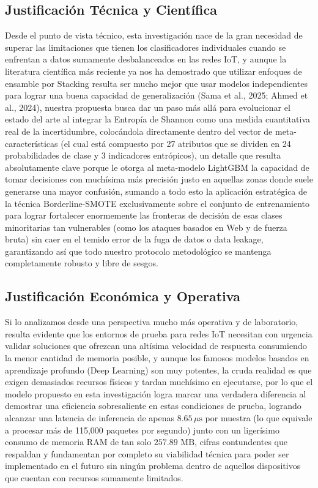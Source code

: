 \subsection{Justificación Técnica y Científica}
Desde el punto de vista técnico, esta investigación nace de la gran necesidad de superar las limitaciones que tienen los clasificadores individuales cuando se enfrentan a datos sumamente desbalanceados en las redes IoT, y aunque la literatura científica más reciente ya nos ha demostrado que utilizar enfoques de ensamble por Stacking resulta ser mucho mejor que usar modelos independientes para lograr una buena capacidad de generalización (Sama et al., 2025; Ahmed et al., 2024), nuestra propuesta busca dar un paso más allá para evolucionar el estado del arte al integrar la Entropía de Shannon como una medida cuantitativa real de la incertidumbre, colocándola directamente dentro del vector de meta-características (el cual está compuesto por 27 atributos que se dividen en 24 probabilidades de clase y 3 indicadores entrópicos), un detalle que resulta absolutamente clave porque le otorga al meta-modelo LightGBM la capacidad de tomar decisiones con muchísima más precisión justo en aquellas zonas donde suele generarse una mayor confusión, sumando a todo esto la aplicación estratégica de la técnica Borderline-SMOTE exclusivamente sobre el conjunto de entrenamiento para lograr fortalecer enormemente las fronteras de decisión de esas clases minoritarias tan vulnerables (como los ataques basados en Web y de fuerza bruta) sin caer en el temido error de la fuga de datos o data leakage, garantizando así que todo nuestro protocolo metodológico se mantenga completamente robusto y libre de sesgos.

\subsection{Justificación Económica y Operativa}
Si lo analizamos desde una perspectiva mucho más operativa y de laboratorio, resulta evidente que los entornos de prueba para redes IoT necesitan con urgencia validar soluciones que ofrezcan una altísima velocidad de respuesta consumiendo la menor cantidad de memoria posible, y aunque los famosos modelos basados en aprendizaje profundo (Deep Learning) son muy potentes, la cruda realidad es que exigen demasiados recursos físicos y tardan muchísimo en ejecutarse, por lo que el modelo propuesto en esta investigación logra marcar una verdadera diferencia al demostrar una eficiencia sobresaliente en estas condiciones de prueba, logrando alcanzar una latencia de inferencia de apenas $8.65\,\mu\text{s}$ por muestra (lo que equivale a procesar más de 115,000 paquetes por segundo) junto con un ligerísimo consumo de memoria RAM de tan solo $257.89\text{ MB}$, cifras contundentes que respaldan y fundamentan por completo su viabilidad técnica para poder ser implementado en el futuro sin ningún problema dentro de aquellos dispositivos que cuentan con recursos sumamente limitados.

